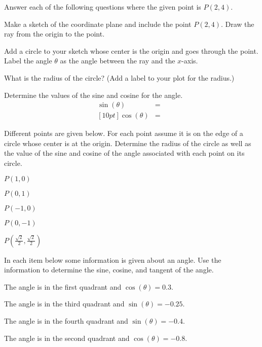 \begin{problem}
\item Answer each of the following questions where the given point is $P(2,4)$.
  \begin{subproblem}
  \item Make a sketch of the coordinate plane and include the point
    $P(2,4)$. Draw the ray from the origin to the point.
    \vfill
  \item Add a circle to your sketch whose center is the origin and goes
    through the point. Label the angle $\theta$ as the angle between
    the ray and the $x$-axis.
  \item What is the radius of the circle? (Add a label to your plot for the radius.)
    \vspace{2em}
  \item Determine the values of the sine and cosine for the angle.
    \begin{eqnarray*}
      \sin(\theta) & = & \\ [10pt]
      \cos(\theta) & = &
    \end{eqnarray*}
  \end{subproblem}

\clearpage

\item Different points are given below. For each point assume it is
  on the edge of a circle whose center is at the origin.
  Determine the radius of the circle as well as the value of the
  sine and cosine of the angle associated with each point on its circle.
  \begin{subproblem}
  \item $P(1,0)$
    \vfill
  \item $P(0,1)$
    \vfill
  \item $P(-1,0)$
    \vfill
  \item $P(0,-1)$
    \vfill
  \item $P\left(\frac{\sqrt{2}}{2},\frac{\sqrt{2}}{2}\right)$
    \vfill
  \end{subproblem}

\clearpage

\item In each item below some information is given about an angle.
  Use the information to determine the sine, cosine, and tangent of the
  angle.
  \begin{subproblem}
    \item The angle is in the first quadrant and $\cos(\theta)=0.3$.
      \vfill
    \item The angle is in the third quadrant and $\sin(\theta)=-0.25$.
      \vfill
    \item The angle is in the fourth quadrant and $\sin(\theta)=-0.4$.
      \vfill
    \item The angle is in the second quadrant and $\cos(\theta)=-0.8$.
      \vfill
  \end{subproblem}

\end{problem}

